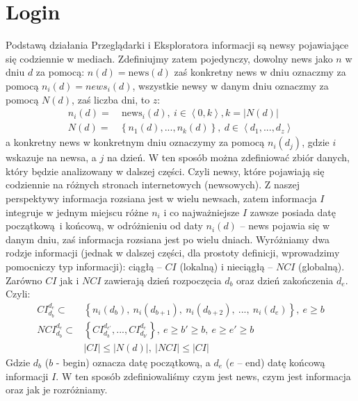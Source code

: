 \section{Login}

Podstawą działania Przeglądarki i Eksploratora informacji są newsy pojawiające się codziennie w mediach. 
Zdefiniujmy zatem pojedynczy, dowolny news jako $n$ w dniu $d$ za pomocą: $n(d) = \textrm{news}(d)$ 
zaś konkretny news w dniu oznaczmy za pomocą $n_{i}(d) = news_{i}(d)$, wszystkie newsy w danym dniu 
oznaczmy za pomocą $N(d)$, zaś liczba dni, to $z$:
\begin{equation}
    \begin{aligned}
        n_{i}(d) = & \: \textrm{news}_{i}(d), \: i \in \left<0, k\right>, k = |N(d)| \\
        N(d) = & \left\{ n_{1}(d), ..., n_{k}(d) \right\}, \: d \in \left<d_{1}, ..., d_{z} \right>
    \end{aligned}
\end{equation}
a konkretny news w konkretnym dniu oznaczymy za pomocą $n_{i}(d_{j})$, gdzie $i$ wskazuje na newsa, 
a $j$ na dzień. W ten sposób można zdefiniować zbiór danych, który będzie analizowany w dalszej części. 
Czyli newsy, które pojawiają się codziennie na różnych stronach internetowych (newsowych). Z naszej perspektywy 
informacja rozsiana jest w wielu newsach, zatem informacja $I$ integruje w jednym miejscu różne $n_{i}$ 
i co najważniejsze $I$ zawsze posiada datę początkową i końcową, w odróżnieniu od daty $n_i(d)$ -- news 
pojawia się w danym dniu, zaś informacja rozsiana jest po wielu dniach. Wyróżniamy dwa rodzje informacji 
(jednak w dalszej części, dla prostoty definicji, wprowadzimy pomocniczy typ informacji): 
ciągłą -- $CI$ (lokalną) i nieciągłą -- $NCI$ (globalną). Zarówno $CI$ jak i $NCI$ zawierają 
dzień rozpoczęcia $d_{b}$ oraz dzień zakończenia $d_{e}$. Czyli:
\begin{equation} \label{eq:def_info}
    \begin{aligned}
        CI_{d_{b}}^{d_{e}} \subset & 
            \left\{ 
                n_{i}(d_{b}), \: 
                n_{i}(d_{b+1}), \: 
                n_{i}(d_{b+2}), \: 
                ..., \: 
                n_{i}(d_{e}) 
            \right\}, \: e \geq b \\
        NCI_{d_{b}}^{d_{e}} \subset & 
            \left\{ 
                CI_{d_{b}}^{d_{e'}}, 
                ..., 
                CI_{d_{b'}}^{d_{e}} 
            \right\}, \: e \geq b' \geq b, \: e \geq e' \geq b \\
        & |CI| \leq |N(d)|, \: |NCI| \leq |CI|
    \end{aligned}
\end{equation}
Gdzie $d_{b}$ ($b$ - begin) oznacza datę początkową, a $d_{e}$ ($e$ -- end) datę końcową informacji $I$. 
W ten sposób zdefiniowaliśmy czym jest news, czym jest informacja oraz jak je rozróżniamy.